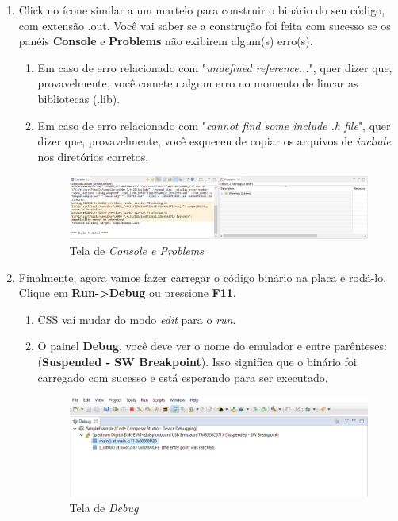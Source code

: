 \documentclass[a4paper, 12pt]{article}
\begin{document}
\begin{enumerate} 
	\item Click no ícone similar a um martelo para construir o binário do seu código, com extensão .out. Você vai saber se a construção foi feita com sucesso se os panéis \textbf{Console} e \textbf{Problems} não exibirem algum(s) erro(s).
	\begin{enumerate}
		\item Em caso de erro relacionado com "\textit{undefined reference...}", quer dizer que, provavelmente, você cometeu algum erro no momento de lincar as bibliotecas (.lib).
		\item Em caso de erro relacionado com "\textit{cannot find some include .h file}", quer dizer que, provavelmente, você esqueceu de copiar os arquivos de \textit{include} nos diretórios corretos.
		
		  \begin{figure}[!htbp] 
		  	\hspace{-15pt}
		  	\includegraphics[scale=0.32]{console_problems.png}
		  	\caption{Tela de \textit{Console e Problems}}
		  	\label{Fig:dspconsole}
		  	
		  \end{figure}
	\end{enumerate}
	\item Finalmente, agora vamos fazer carregar o código binário na placa e rodá-lo. Clique em \textbf{Run->Debug} ou pressione \textbf{F11}.
	
	\begin{enumerate}
		\item CSS vai mudar do modo \textit{edit} para o \textit{run}.
		\item O painel \textbf{Debug}, você deve ver o nome do emulador e entre parênteses: (\textbf{Suspended - SW Breakpoint}). Isso significa que o binário foi carregado com sucesso e está esperando para ser executado.
		
		\begin{figure}[!htbp] 
			\includegraphics[scale=0.42]{waittorun.png}
			\caption{Tela de \textit{Debug}}
			\label{Fig:dspwaittorun}
			

\end{figure}
\end{enumerate}
\end{enumerate}
\end{document}
